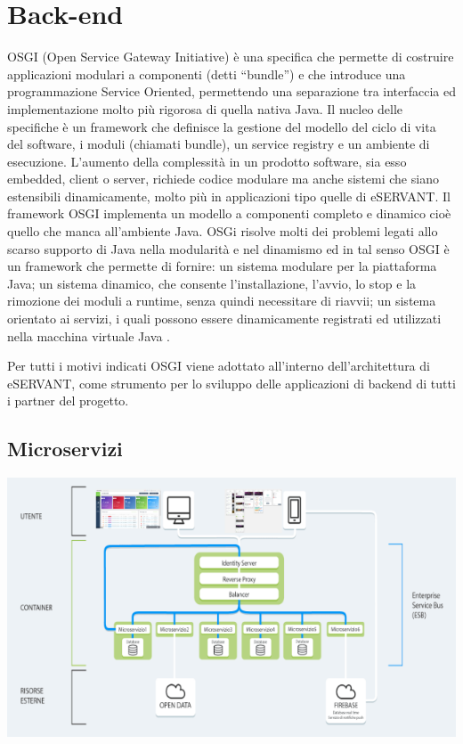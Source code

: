 \section{Back-end}
OSGI (Open Service Gateway Initiative) è una specifica che permette di costruire
applicazioni modulari a componenti (detti “bundle”) e che introduce una
programmazione Service Oriented, permettendo una separazione tra interfaccia ed
implementazione molto più rigorosa di quella nativa Java.
Il nucleo delle specifiche è un framework che definisce la gestione del modello del ciclo di vita del software, i moduli (chiamati bundle), un service registry e un ambiente di esecuzione. 
L’aumento della complessità in un prodotto software, sia esso embedded, client o server, richiede codice modulare ma anche sistemi che siano estensibili dinamicamente, molto più in applicazioni tipo quelle di eSERVANT. Il framework OSGI implementa un modello a componenti completo e dinamico cioè quello che manca all’ambiente Java. 
OSGi risolve molti dei problemi legati allo scarso supporto di Java nella modularità e nel dinamismo ed in tal senso OSGI è un framework che permette di fornire: 
un sistema modulare per la piattaforma Java;
un sistema dinamico, che consente l’installazione, l’avvio, lo stop e la
rimozione dei moduli a runtime, senza quindi necessitare di riavvii;
un sistema orientato ai servizi, i quali possono essere dinamicamente
registrati ed utilizzati nella macchina virtuale Java .

Per tutti i motivi indicati OSGI viene adottato all’interno dell’architettura di eSERVANT,
come strumento per lo sviluppo delle applicazioni di backend di tutti i partner del
progetto.

\subsection{Microservizi}
\includegraphics[scale=0.5]{img/cap1/architecture}\\


